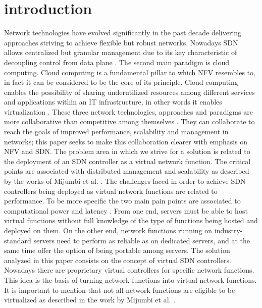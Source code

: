 \documentclass[sigconf]{Template}
\begin{document}
\section{introduction}\label{introduction}
Network technologies have evolved significantly in the past decade delivering approaches striving to achieve flexible but robust networks. Nowadays SDN allows centralized but granular management due to its key characteristic of decoupling control from data plane \cite{xia2015_SDN_survey}. The second main paradigm is cloud computing. Cloud computing is a fundamental pillar to which NFV resembles to, in fact it can be considered to be the core of its principle. Cloud computing enables the possibility of sharing underutilized resources among different services and applications within an IT infrastructure, in other words it enables virtualization \cite{doherty2016sdn}.
These three network technologies, approaches and paradigms are more collaborative than competitive among themselves \cite{mijumbi2016_NFV_stateofart}. They can collaborate to reach the goals of  improved performance, scalability and management in networks; this paper seeks to make this collaboration clearer with emphasis on NFV and SDN. %
The problem area in which we strive for a solution is related to the deployment of an SDN controller as a virtual network function.
The critical points are associated with distributed management and scalability as described by the works of Mijumbi et al. \cite{mijumbi2016_NFV_stateofart}.
The challenges faced in order to achieve SDN controllers being deployed as virtual network functions are related to performance. To be more specific the two main pain points are associated to computational power and latency \cite{nfv2014etsi}. From one end, servers must be able to host virtual functions without full knowledge of the type of functions being hosted and deployed on them. On the other end, network functions running on industry-standard servers need to perform as reliable as on dedicated servers, and at the same time offer the option of being portable among servers. 
The solution analyzed in this paper consists on the concept of virtual SDN controllers. Nowadays there are proprietary virtual controllers for specific network functions. This idea is the basis of turning network functions into virtual network functions. It is important to mention that not all network functions are eligible to be virtualized as described in the work by Mijumbi et al.  \cite{mijumbi2016_NFV_stateofart}. 
\end{document}
